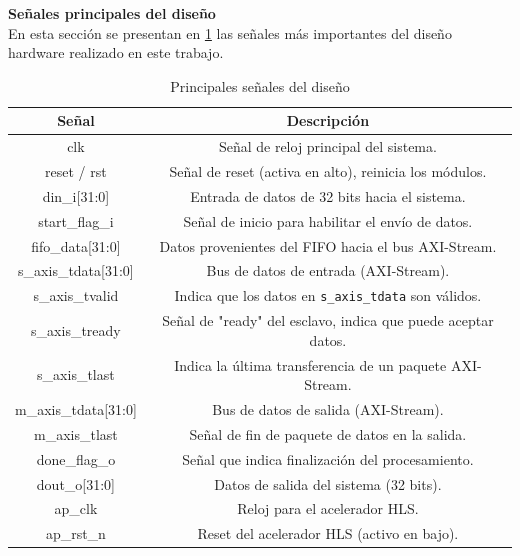 \vspace{0.4em} %

\begin{adjustwidth}{1.5cm}{}
\textbf{Señales principales del diseño} \vspace{0.25cm} \\
En esta sección se presentan en \ref{tbl:senalesDiseno} las señales más importantes del diseño hardware realizado en este trabajo. 

\begin{table}[H]
\centering
\resizebox{10cm}{!} {
    \begin{tabular}{|c|c|}
    \hline
    \textbf{Señal} & \textbf{Descripción} \\
    \hline
    clk & Señal de reloj principal del sistema. \\
    \hline
    reset / rst & Señal de reset (activa en alto), reinicia los módulos. \\
    \hline
    din\_i[31:0] & Entrada de datos de 32 bits hacia el sistema. \\
    \hline
    start\_flag\_i & Señal de inicio para habilitar el envío de datos. \\
    \hline
    fifo\_data[31:0] & Datos provenientes del FIFO hacia el bus AXI-Stream. \\
    \hline
    s\_axis\_tdata[31:0] & Bus de datos de entrada (AXI-Stream). \\
    \hline
    s\_axis\_tvalid & Indica que los datos en \texttt{s\_axis\_tdata} son válidos. \\
    \hline
    s\_axis\_tready & Señal de "ready" del esclavo, indica que puede aceptar datos. \\
    \hline
    s\_axis\_tlast & Indica la última transferencia de un paquete AXI-Stream. \\
    \hline
    m\_axis\_tdata[31:0] & Bus de datos de salida (AXI-Stream). \\
    \hline
    m\_axis\_tlast & Señal de fin de paquete de datos en la salida. \\
    \hline
    done\_flag\_o & Señal que indica finalización del procesamiento. \\
    \hline
    dout\_o[31:0] & Datos de salida del sistema (32 bits). \\
    \hline
    ap\_clk & Reloj para el acelerador HLS. \\
    \hline
    ap\_rst\_n & Reset del acelerador HLS (activo en bajo). \\
    \hline
    \end{tabular}
}
\label{tbl:senalesDiseno}
\caption{Principales señales del diseño}
\end{table}


\end{adjustwidth}
